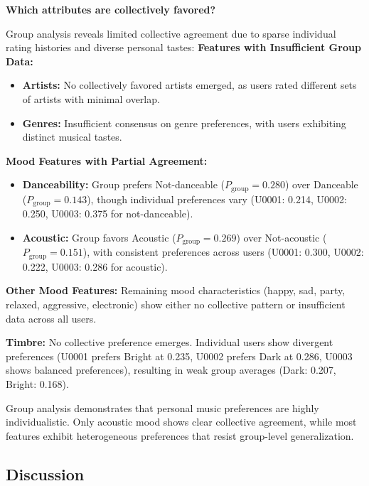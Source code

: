 \documentclass[12pt,a4paper]{article}
\begin{document}
\textbf{Which attributes are collectively favored?}

Group analysis reveals limited collective agreement due to sparse individual rating histories and diverse personal tastes:
\newline
\textbf{\indent Features with Insufficient Group Data:}
\begin{itemize}
    \item \textbf{Artists:} No collectively favored artists emerged, as users rated different sets of artists with minimal overlap.
    \item \textbf{Genres:} Insufficient consensus on genre preferences, with users exhibiting distinct musical tastes.
\end{itemize}

\textbf{Mood Features with Partial Agreement:}
\begin{itemize}
    \item \textbf{Danceability:} Group prefers Not-danceable ($P_{\text{group}} = 0.280$) over Danceable ($P_{\text{group}} = 0.143$), though individual preferences vary (U0001: 0.214, U0002: 0.250, U0003: 0.375 for not-danceable).
    
    \item \textbf{Acoustic:} Group favors Acoustic ($P_{\text{group}} = 0.269$) over Not-acoustic ($P_{\text{group}} = 0.151$), with consistent preferences across users (U0001: 0.300, U0002: 0.222, U0003: 0.286 for acoustic).
\end{itemize}

\textbf{Other Mood Features:} Remaining mood characteristics (happy, sad, party, relaxed, aggressive, electronic) show either no collective pattern or insufficient data across all users.

\textbf{Timbre:} No collective preference emerges. Individual users show divergent preferences (U0001 prefers Bright at 0.235, U0002 prefers Dark at 0.286, U0003 shows balanced preferences), resulting in weak group averages (Dark: 0.207, Bright: 0.168).

Group analysis demonstrates that personal music preferences are highly individualistic. Only acoustic mood shows clear collective agreement, while most features exhibit heterogeneous preferences that resist group-level generalization.

\subsection{Discussion}
\end{document}
